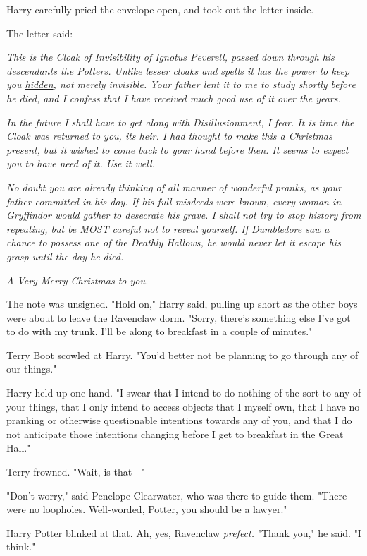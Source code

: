 Harry carefully pried the envelope open, and took out the letter inside.

The letter said:

\emph{This is the Cloak of Invisibility of Ignotus Peverell, passed down 
through his descendants the Potters. Unlike lesser cloaks and spells it has the 
power to keep you \underline{hidden}, not merely invisible. Your father lent it 
to me to study shortly before he died, and I confess that I have received much 
good use of it over the years.}

\emph{In the future I shall have to get along with Disillusionment, I fear. It 
is time the Cloak was returned to you, its heir. I had thought to make this a 
Christmas present, but it wished to come back to your hand before then. It 
seems to expect you to have need of it. Use it well.}

\emph{No doubt you are already thinking of all manner of wonderful pranks, as 
your father committed in his day. If his full misdeeds were known, every woman 
in Gryffindor would gather to desecrate his grave. I shall not try to stop 
history from repeating, but be MOST careful not to reveal yourself. If 
Dumbledore saw a chance to possess one of the Deathly Hallows, he would never 
let it escape his grasp until the day he died.}

\emph{A Very Merry Christmas to you.}

The note was unsigned.
\sbreak
"Hold on," Harry said, pulling up short as the other boys were about to leave 
the Ravenclaw dorm. "Sorry, there's something else I've got to do with my 
trunk. I'll be along to breakfast in a couple of minutes."

Terry Boot scowled at Harry. "You'd better not be planning to go through any of 
our things."

Harry held up one hand. "I swear that I intend to do nothing of the sort to any 
of your things, that I only intend to access objects that I myself own, that I 
have no pranking or otherwise questionable intentions towards any of you, and 
that I do not anticipate those intentions changing before I get to breakfast in 
the Great Hall."

Terry frowned. "Wait, is that---"

"Don't worry," said Penelope Clearwater, who was there to guide them. "There 
were no loopholes. Well-worded, Potter, you should be a lawyer."

Harry Potter blinked at that. Ah, yes, Ravenclaw \emph{prefect.} "Thank you," 
he said. "I think."


